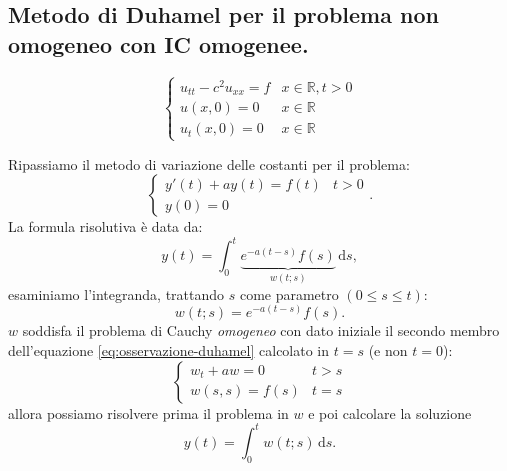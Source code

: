 \documentclass[10pt,a4paper,twoside,openright]{book}
\newcommand{\de}{\,\mathrm d}
\newcommand{\ds}{\de s}
\begin{document}
\subsection{Metodo di Duhamel per il problema non omogeneo con IC omogenee.}
\begin{equation}
	\begin{cases}
		u_{tt} -c^{2} u_{xx} =f & x\in \mathbb{R} ,t >0 \\
		u(x,0) =0          & x\in \mathbb{R}       \\
		u_{t}(x,0) =0      & x\in \mathbb{R}       
	\end{cases}
\end{equation}
\begin{oss}
	Ripassiamo il metodo di variazione delle costanti per il problema:
	\begin{equation*}
		\begin{cases}
			y'(t) +ay(t) =f(t) & t >0 \\
			y(0) =0              &      
		\end{cases} .
	\end{equation*}
	La formula risolutiva è data da:
	\begin{equation*}
		y(t) =\int _{0}^{t}\underbrace{e^{-a(t-s)} f(s)}_{w(t;s)} \ds,
	\end{equation*}
	esaminiamo l'integranda, trattando $s$ come parametro $\displaystyle (0\leqslant s\leqslant t)$:
	\begin{equation}
		w(t;s) =e^{-a(t-s)} f(s) .
		\label{eq:osservazione-duhamel}
	\end{equation}
	$w$ soddisfa il problema di Cauchy \textit{omogeneo} con dato iniziale il secondo membro dell'equazione \eqref{eq:osservazione-duhamel} calcolato in $t=s$ (e non $t=0$):
	\begin{equation*}
		\begin{cases}
			w_{t} +aw=0    & t >s \\
			w(s,s) =f(s) & t=s  
		\end{cases}
	\end{equation*}
	allora possiamo risolvere prima il problema in $w$ e poi calcolare la soluzione
	\begin{equation*}
		y(t) =\int _{0}^{t} w(t;s) \ds.
	\end{equation*}
\end{oss}
\end{document}
